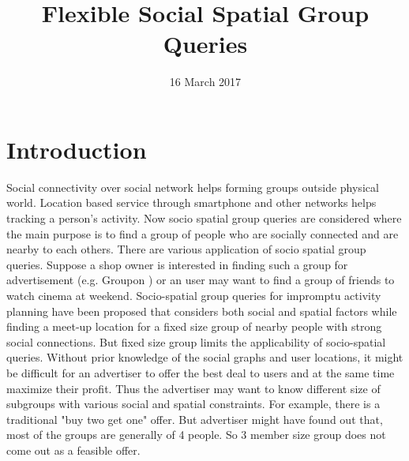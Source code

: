 \documentclass{vldb}
\begin{document}
	\title{ Flexible Social Spatial Group Queries}
	
	
	\author{
	}
	
	\date{16 March 2017}
	\maketitle
	
	



	\section{Introduction}
		Social connectivity over social network helps forming groups outside physical world. Location based service through smartphone and other networks helps tracking a person's activity. Now socio spatial group queries are considered where the main purpose is to find a group of  people who are socially connected and are nearby to each others. There are various application of socio spatial group queries. Suppose a shop owner is interested in finding such a group for advertisement (e.g. Groupon )  or an user may want to find a group of friends to watch cinema at weekend.  Socio-spatial group queries for impromptu activity planning have been proposed \cite{shen2016socio}  that considers both social and spatial factors while finding a meet-up location for a fixed size group of nearby people with strong social connections. But fixed size group limits the applicability of socio-spatial queries. Without prior knowledge of the social graphs and user locations, it might be difficult for an advertiser to offer the best deal to users and at the same time maximize their profit. Thus the advertiser may want to know different size of subgroups with various social and spatial constraints. For example, there is a traditional "buy two get one" offer. But advertiser might have found out that, most of the groups are generally of 4 people. So 3 member size group does not come out as a feasible offer. 
		
		
		
\end{document}
